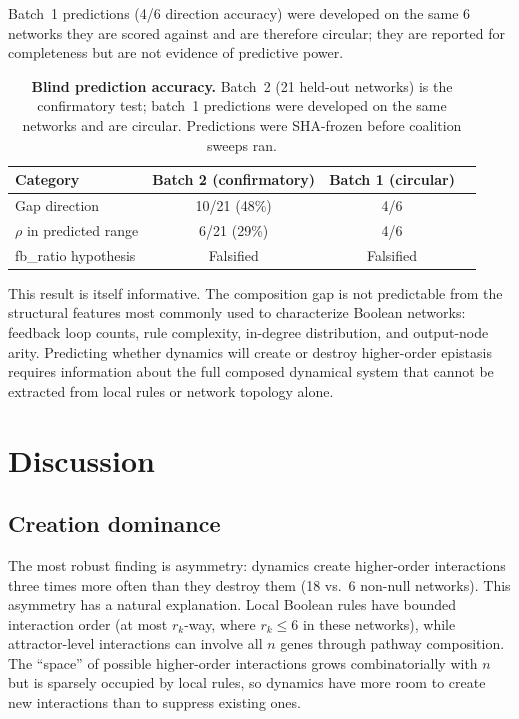 \documentclass[10pt,letterpaper]{article}
\begin{document}
Batch~1 predictions (4/6 direction accuracy) were developed on the
same 6 networks they are scored against and are therefore circular;
they are reported for completeness but are not evidence of predictive
power.

\begin{table}[!h]
\centering
\caption{{\bf Blind prediction accuracy.} Batch~2 (21 held-out
networks) is the confirmatory test; batch~1 predictions were developed
on the same networks and are circular. Predictions were SHA-frozen
before coalition sweeps ran.}
\label{tab:blind}
\begin{tabular}{lccc}
\toprule
Category & Batch 2 (confirmatory) & Batch 1 (circular) \\
\midrule
Gap direction & 10/21 (48\%) & 4/6 \\
$\rho$ in predicted range & 6/21 (29\%) & 4/6 \\
fb\_ratio hypothesis & Falsified & Falsified \\
\bottomrule
\end{tabular}
\end{table}

This result is itself informative. The composition gap is not
predictable from the structural features most commonly used to
characterize Boolean networks: feedback loop counts, rule complexity,
in-degree distribution, and output-node arity. Predicting whether
dynamics will create or destroy higher-order epistasis requires
information about the full composed dynamical system that cannot be
extracted from local rules or network topology alone.


\section*{Discussion}
\label{sec:discussion}

\subsection*{Creation dominance}

The most robust finding is asymmetry: dynamics create higher-order
interactions three times more often than they destroy them (18 vs.\ 6
non-null networks). This asymmetry has a natural explanation. Local
Boolean rules have bounded interaction order (at most $r_k$-way,
where $r_k \leq 6$ in these networks), while attractor-level
interactions can involve all $n$ genes through pathway composition.
The ``space'' of possible higher-order interactions grows
combinatorially with $n$ but is sparsely occupied by local rules,
so dynamics have more room to create new interactions than to
suppress existing ones.
\end{document}
